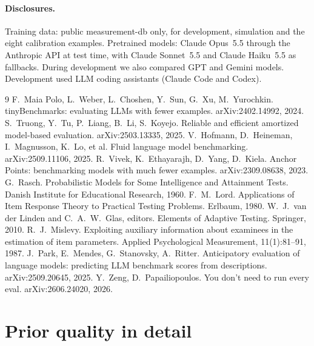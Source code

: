 \documentclass{article}
\begin{document}
\paragraph{Disclosures.} Training data: public measurement-db only, for development, simulation and the eight calibration examples. Pretrained models: Claude Opus~5.5 through the Anthropic API at test time, with Claude Sonnet~5.5 and Claude Haiku~5.5 as fallbacks. During development we also compared GPT and Gemini models. Development used LLM coding assistants (Claude Code and Codex).


\begin{thebibliography}{9}
 F.~Maia Polo, L.~Weber, L.~Choshen, Y.~Sun, G.~Xu, M.~Yurochkin. tinyBenchmarks: evaluating LLMs with fewer examples. arXiv:2402.14992, 2024.
 S.~Truong, Y.~Tu, P.~Liang, B.~Li, S.~Koyejo. Reliable and efficient amortized model-based evaluation. arXiv:2503.13335, 2025.
 V.~Hofmann, D.~Heineman, I.~Magnusson, K.~Lo, et al. Fluid language model benchmarking. arXiv:2509.11106, 2025.
 R.~Vivek, K.~Ethayarajh, D.~Yang, D.~Kiela. Anchor Points: benchmarking models with much fewer examples. arXiv:2309.08638, 2023.
 G.~Rasch. Probabilistic Models for Some Intelligence and Attainment Tests. Danish Institute for Educational Research, 1960.
 F.~M.~Lord. Applications of Item Response Theory to Practical Testing Problems. Erlbaum, 1980.
 W.~J.~van der Linden and C.~A.~W.~Glas, editors. Elements of Adaptive Testing. Springer, 2010.
 R.~J.~Mislevy. Exploiting auxiliary information about examinees in the estimation of item parameters. Applied Psychological Measurement, 11(1):81--91, 1987.
 J.~Park, E.~Mendes, G.~Stanovsky, A.~Ritter. Anticipatory evaluation of language models: predicting LLM benchmark scores from descriptions. arXiv:2509.20645, 2025.
 Y.~Zeng, D.~Papailiopoulos. You don't need to run every eval. arXiv:2606.24020, 2026.
\end{thebibliography}

\appendix

\section{Prior quality in detail}
\label{app:prior}
\end{document}
